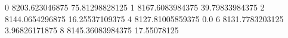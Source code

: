 0 8203.623046875 75.81298828125
1 8167.6083984375 39.79833984375
2 8144.0654296875 16.25537109375
4 8127.81005859375 0.0
6 8131.7783203125 3.96826171875
8 8145.36083984375 17.55078125
